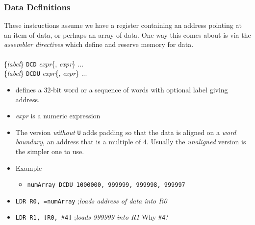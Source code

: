 \documentclass[10pt]{beamer}
\begin{document}
\begin{frame}
\frametitle{Data Definitions}
These instructions assume we have a register containing an address pointing at an item of data, or perhaps an array of data. One way this comes about is via the \emph{assembler directives} which define and reserve memory for data.\\
~\\
\{\textit{label}\} \texttt{DCD} \textit{expr}\{, \textit{expr}\} ...\\ 
\{\textit{label}\} \texttt{DCDU} \textit{expr}\{, \textit{expr}\} ... 
\begin{itemize}
\item defines a 32-bit word or a sequence of words with optional label giving address.
\item \textit{expr} is a numeric expression
\item The version \emph{without} \texttt{U} adds padding so that the data is aligned on a \emph{word boundary}, an address that is a multiple of 4. Usually the \emph{unaligned} version is the simpler one to use. 
\item Example
  \begin{itemize}
  \item \texttt{\color{brown}numArray DCDU 1000000, 999999, 999998, 999997}
  \end{itemize}
\item \texttt{\color{brown}LDR R0, =numArray} ;\emph{loads address of data into R0}
\item \texttt{\color{brown}LDR R1, [R0, \#4]} ;\emph{loads 999999 into R1} {\color{brown}Why \texttt{\#4}?} 
\end{itemize}
\end{frame}
\end{document}

